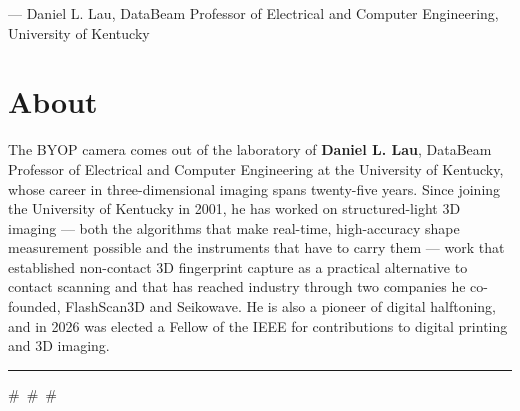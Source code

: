 \documentclass[11pt]{article}
\newcommand{\pressrule}{\textcolor{ukblue}{\rule{\linewidth}{1.2pt}}}
\begin{document}
\noindent --- Daniel L. Lau, DataBeam Professor of Electrical and Computer
Engineering, University of Kentucky

\vfill

\section{About}

The BYOP camera comes out of the laboratory of \textbf{Daniel L. Lau}, DataBeam
Professor of Electrical and Computer Engineering at the University of Kentucky, whose
career in three-dimensional imaging spans twenty-five years. Since joining the
University of Kentucky in 2001, he has worked on structured-light 3D imaging --- both
the algorithms that make real-time, high-accuracy shape measurement possible and the
instruments that have to carry them --- work that established non-contact 3D
fingerprint capture as a practical alternative to contact scanning and that has reached
industry through two companies he co-founded, FlashScan3D and Seikowave. He is also a
pioneer of digital halftoning, and in 2026 was elected a Fellow of the IEEE for
contributions to digital printing and 3D imaging.

\vspace{6pt}
\pressrule
\begin{center}\small \#\ \#\ \#\end{center}
\end{document}
